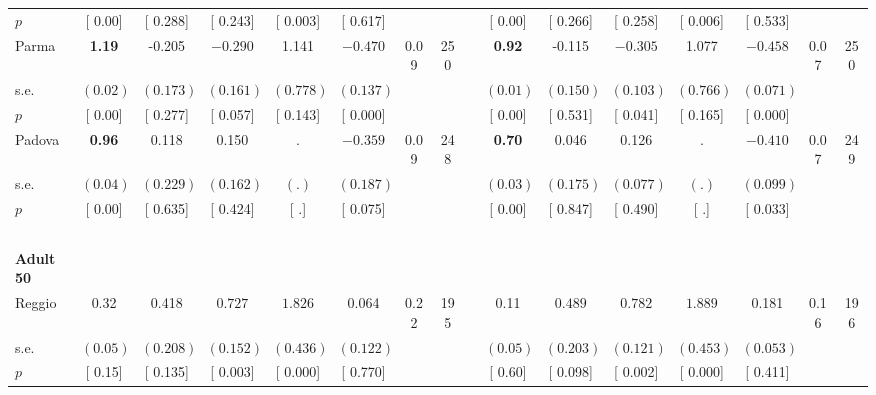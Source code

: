 \begin{longtable}{L{8em} c c c c c c c p{1em} c c c c c c c}
\quad \quad \quad \quad $ p$ & [     0.00] & [    0.288] & [    0.243] & [    0.003] & [    0.617] & & & & [     0.00] & [    0.266] & [    0.258] & [    0.006] & [    0.533] & &  \\[1em]
\quad \quad \quad Parma& \textbf{     1.19} &    -0.205 & $ \mathbf{   -0.290}$ &     1.141 & $ \mathbf{   -0.470}$ &      0.09 &       250 & & \textbf{     0.92} &    -0.115 & $ \mathbf{   -0.305}$ &     1.077 & $ \mathbf{   -0.458}$ &      0.07 &       250  \\*
\quad \quad \quad \quad s.e.& $ (     0.02)$ & $ (    0.173)$ & $ (    0.161)$ & $ (    0.778)$ & $ (    0.137)$ & & & & $ (     0.01)$ & $ (    0.150)$ & $ (    0.103)$ & $ (    0.766)$ & $ (    0.071)$ & &  \\*
\quad \quad \quad \quad $ p$ & [     0.00] & [    0.277] & [    0.057] & [    0.143] & [    0.000] & & & & [     0.00] & [    0.531] & [    0.041] & [    0.165] & [    0.000] & &  \\[1em]
\quad \quad \quad Padova& \textbf{     0.96} &     0.118 &     0.150 &         . & $ \mathbf{   -0.359}$ &      0.09 &       248 & & \textbf{     0.70} &     0.046 &     0.126 &         . & $ \mathbf{   -0.410}$ &      0.07 &       249  \\*
\quad \quad \quad \quad s.e.& $ (     0.04)$ & $ (    0.229)$ & $ (    0.162)$ & $ (        .)$ & $ (    0.187)$ & & & & $ (     0.03)$ & $ (    0.175)$ & $ (    0.077)$ & $ (        .)$ & $ (    0.099)$ & &  \\*
\quad \quad \quad \quad $ p$ & [     0.00] & [    0.635] & [    0.424] & [        .] & [    0.075] & & & & [     0.00] & [    0.847] & [    0.490] & [        .] & [    0.033] & &  \\[1em]
~\\[1em]
\quad \quad \textbf{Adult 50} & & & & & & & & & & & & & & & \\* 
\quad \quad \quad Reggio& 0.32 &     0.418 & $ \mathbf{    0.727}$ & $ \mathbf{    1.826}$ &     0.064 &      0.22 &       195 & & 0.11 & $ \mathbf{    0.489}$ & $ \mathbf{    0.782}$ & $ \mathbf{    1.889}$ &     0.181 &      0.16 &       196  \\*
\quad \quad \quad \quad s.e.& $ (     0.05)$ & $ (    0.208)$ & $ (    0.152)$ & $ (    0.436)$ & $ (    0.122)$ & & & & $ (     0.05)$ & $ (    0.203)$ & $ (    0.121)$ & $ (    0.453)$ & $ (    0.053)$ & &  \\*
\quad \quad \quad \quad $ p$ & [     0.15] & [    0.135] & [    0.003] & [    0.000] & [    0.770] & & & & [     0.60] & [    0.098] & [    0.002] & [    0.000] & [    0.411] & &  \\[1em]

\end{longtable}
